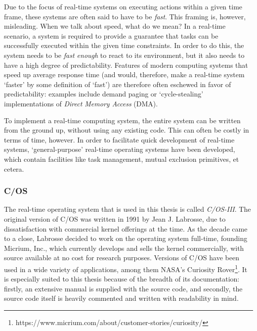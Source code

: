 \documentclass[twoside]{uva-inf-bachelor-thesis}
\newcommand{\ucosiii}{\textmu C/OS-III\xspace}
\newcommand{\ucos}{\textmu C/OS\xspace}
\begin{document}
Due to the focus of real-time systems on executing actions within a given time frame, these systems are often said to have to be \textit{fast}. This framing is, however, misleading. When we talk about speed, what do we mean? In a real-time scenario, a system is required to provide a guarantee that tasks can be successfully executed within the given time constraints. In order to do this, the system needs to be \textit{fast enough} to react to its environment, but it also needs to have a high degree of predictability. Features of modern computing systems that speed up average response time (and would, therefore, make a real-time system `faster' by some definition of `fast') are therefore often eschewed in favor of predictability: examples include demand paging or `cycle-stealing' implementations of \textit{Direct Memory Access} (DMA).

To implement a real-time computing system, the entire system can be written from the ground up, without using any existing code. This can often be costly in terms of time, however. In order to facilitate quick development of real-time systems, `general-purpose' real-time operating systems have been developed, which contain facilities like task management, mutual exclusion primitives, et cetera.

\subsubsection{\ucos} \label{sec:ucos}
The real-time operating system that is used in this thesis is called \textit{\ucosiii}. The original version of \ucos was written in 1991 by Jean J. Labrosse, due to dissatisfaction with commercial kernel offerings at the time. As the decade came to a close, Labrosse decided to work on the operating system full-time, founding Micrium, Inc., which currently develops and sells the kernel commercially, with source available at no cost for research purposes. Versions of \ucos have been used in a wide variety of applications, among them NASA's Curiosity Rover\footnote{https://www.micrium.com/about/customer-stories/curiosity/}. It is especially suited to this thesis because of the breadth of its documentation: firstly, an extensive manual \cite{micrium:ucosmanual} is supplied with the source code, and secondly, the source code itself is heavily commented and written with readability in mind.
\end{document}
